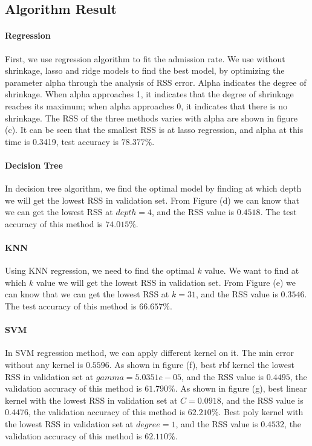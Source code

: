 \documentclass{article}
\begin{document}
\subsection{Algorithm Result}
\paragraph{Regression}
First, we use regression algorithm to fit the admission rate. We use without shrinkage, lasso and ridge models to find the best model, by optimizing the parameter alpha through the analysis of RSS error. Alpha indicates the degree of shrinkage. When alpha approaches 1, it indicates that the degree of shrinkage reaches its maximum; when alpha approaches 0, it indicates that there is no shrinkage.
The RSS of the three methods varies with alpha are shown in figure (c). It can be seen that the smallest RSS is at lasso regression, and alpha at this time is 0.3419, test accuracy is $78.377\%$.


\paragraph{Decision Tree}
In decision tree algorithm, we find the optimal model by finding at which depth we will get the lowest RSS in validation set.
From Figure (d) we can know that we can get the lowest RSS at $depth = 4$, and the RSS value is $0.4518$. The test accuracy of this method is $74.015\%$.


\paragraph{KNN}
Using KNN regression, we need to find the optimal $k$ value. We want to find at which $k$ value we will get the lowest RSS in validation set. From Figure (e) we can know that we can get the lowest RSS at $k=31$, and the RSS value is $0.3546$. The test accuracy of this method is $66.657\%$.



\paragraph{SVM}
In SVM regression method, we can apply different kernel on it. The min error without any kernel is $0.5596$. As shown in figure (f), best rbf kernel the lowest RSS in validation set at $gamma =5.0351e-05$, and the RSS value is $0.4495$, the validation accuracy of this method is $61.790\%$. As shown in figure (g), best linear kernel with the lowest RSS in validation set at $C=0.0918$, and the RSS value is $0.4476$, the validation accuracy of this method is $62.210\%$. Best poly kernel with the lowest RSS in validation set at $degree=1$, and the RSS value is $0.4532$, the validation accuracy of this method is $62.110\%$.
\end{document}
